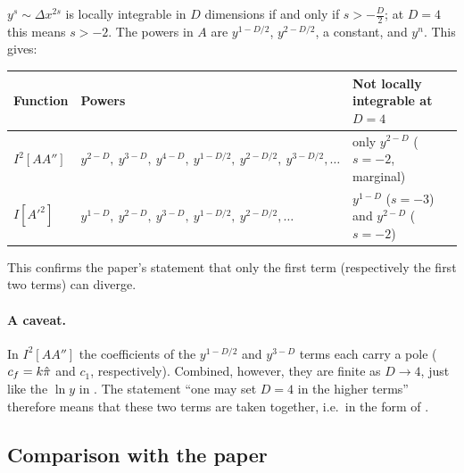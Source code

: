$y^s\sim\Delta x^{2s}$ is locally integrable in $D$ dimensions if and only if $s>-\frac D2$; at $D=4$ this means $s>-2$.
The powers in $A$ are $y^{1-D/2}$, $y^{2-D/2}$, a constant, and $y^n$. This gives:
\begin{center}
\small
\begin{tabular}{@{}lll@{}}
\toprule
Function & Powers & Not locally integrable at $D=4$\\
\midrule
$I^2[AA'']$ & $y^{2-D},\ y^{3-D},\ y^{4-D},\ y^{1-D/2},\ y^{2-D/2},\ y^{3-D/2},\ldots$ & only $y^{2-D}$ ($s=-2$, marginal)\\
$I[A'^2]$ & $y^{1-D},\ y^{2-D},\ y^{3-D},\ y^{1-D/2},\ y^{2-D/2},\ldots$ & $y^{1-D}$ ($s=-3$) and $y^{2-D}$ ($s=-2$)\\
\bottomrule
\end{tabular}
\end{center}
This confirms the paper's statement that only the first term (respectively the first two terms) can diverge.
\paragraph{A caveat.} In $I^2[AA'']$ the coefficients of the $y^{1-D/2}$ and $y^{3-D}$ terms each carry a pole ($c_f=k\hat\pi$ and $c_1$, respectively).
Combined, however, they are finite as $D\to4$, just like the $\ln y$ in .
The statement ``one may set $D=4$ in the higher terms'' therefore means that these two terms are taken together, i.e.\ in the form of .

\subsection{Comparison with the paper}
\label{sec:ch05:t11:comp}

